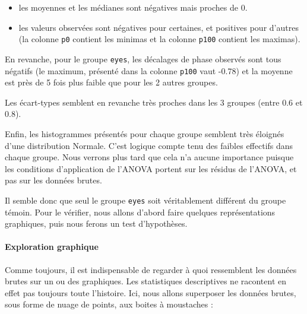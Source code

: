 \documentclass[a4paperpaper,]{article}
\newenvironment{Shaded}{\begin{snugshade}}{\end{snugshade}}
\newcommand{\DataTypeTok}[1]{\textcolor[rgb]{0.00,0.34,0.68}{#1}}
\newcommand{\FloatTok}[1]{\textcolor[rgb]{0.69,0.50,0.00}{#1}}
\newcommand{\KeywordTok}[1]{\textcolor[rgb]{0.12,0.11,0.11}{\textbf{#1}}}
\newcommand{\NormalTok}[1]{\textcolor[rgb]{0.12,0.11,0.11}{#1}}
\newcommand{\OperatorTok}[1]{\textcolor[rgb]{0.12,0.11,0.11}{#1}}
\newcommand{\OtherTok}[1]{\textcolor[rgb]{0.00,0.43,0.16}{#1}}
\newcommand{\StringTok}[1]{\textcolor[rgb]{0.75,0.01,0.01}{#1}}
\providecommand{\tightlist}{%
  \setlength{\itemsep}{0pt}\setlength{\parskip}{0pt}}
\let\oldparagraph\paragraph
\renewcommand{\paragraph}[1]{\oldparagraph{#1}\mbox{}}
\begin{document}
\begin{itemize}
\tightlist
\item
  les moyennes et les médianes sont négatives mais proches de 0.
\item
  les valeurs observées sont négatives pour certaines, et positives pour d'autres (la colonne \texttt{p0} contient les minimas et la colonne \texttt{p100} contient les maximas).
\end{itemize}

En revanche, pour le groupe \texttt{eyes}, les décalages de phase observés sont tous négatifs (le maximum, présenté dans la colonne \texttt{p100} vaut -0.78) et la moyenne est près de 5 fois plus faible que pour les 2 autres groupes.

Les écart-types semblent en revanche très proches dans les 3 groupes (entre 0.6 et 0.8).

Enfin, les histogrammes présentés pour chaque groupe semblent très éloignés d'une distribution Normale. C'est logique compte tenu des faibles effectifs dans chaque groupe. Nous verrons plus tard que cela n'a aucune importance puisque les conditions d'application de l'ANOVA portent sur les résidus de l'ANOVA, et pas sur les données brutes.

Il semble donc que seul le groupe \texttt{eyes} soit véritablement différent du groupe témoin. Pour le vérifier, nous allons d'abord faire quelques représentations graphiques, puis nous ferons un test d'hypothèses.

\hypertarget{exploration-graphique-3}{%
\paragraph{Exploration graphique}\label{exploration-graphique-3}}

Comme toujours, il est indispensable de regarder à quoi ressemblent les données brutes sur un ou des graphiques. Les statistiques descriptives ne racontent en effet pas toujours toute l'histoire. Ici, nous allons superposer les données brutes, sous forme de nuage de points, aux boites à moustaches :

\begin{Shaded}
\end{Shaded}
\end{document}
